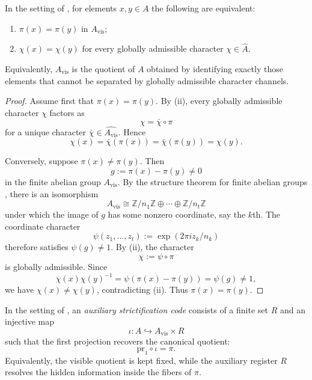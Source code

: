 \begin{corollary}\label{cor:visible-quotient-character-separation}
In the setting of , for elements $x,y\in A$ the following are equivalent:
\begin{enumerate}[label=(\roman*),nosep]
\item $\pi(x)=\pi(y)$ in $A_{\mathrm{vis}}$;
\item $\chi(x)=\chi(y)$ for every globally admissible character $\chi\in\widehat A$.
\end{enumerate}
Equivalently, $A_{\mathrm{vis}}$ is the quotient of $A$ obtained by identifying exactly those elements that cannot be separated by globally admissible character channels.
\end{corollary}

\begin{proof}
Assume first that $\pi(x)=\pi(y)$. By (ii), every globally admissible character $\chi$ factors as
\[
\chi=\bar\chi\circ\pi
\]
for a unique character $\bar\chi\in\widehat{A_{\mathrm{vis}}}$. Hence
\[
\chi(x)=\bar\chi(\pi(x))=\bar\chi(\pi(y))=\chi(y).
\]

Conversely, suppose $\pi(x)\neq\pi(y)$. Then
\[
g:=\pi(x)-\pi(y)\neq 0
\]
in the finite abelian group $A_{\mathrm{vis}}$. By the structure theorem for finite abelian groups \cite{DummitFoote2004}, there is an isomorphism
\[
A_{\mathrm{vis}}\cong \mathbb Z/n_1\mathbb Z\oplus\cdots\oplus \mathbb Z/n_t\mathbb Z
\]
under which the image of $g$ has some nonzero coordinate, say the $k$th. The coordinate character
\[
\psi(z_1,\dots,z_t):=\exp(2\pi i z_k/n_k)
\]
therefore satisfies $\psi(g)\neq 1$. By (ii), the character
\[
\chi:=\psi\circ\pi
\]
is globally admissible. Since
\[
\chi(x)\chi(y)^{-1}=\psi(\pi(x)-\pi(y))=\psi(g)\neq 1,
\]
we have $\chi(x)\neq\chi(y)$, contradicting (ii). Thus $\pi(x)=\pi(y)$.
\end{proof}

\begin{definition}\label{def:auxiliary-strictification-code}
In the setting of , an \emph{auxiliary strictification code} consists of a finite set $R$ and an injective map
\[
\iota:A\hookrightarrow A_{\mathrm{vis}}\times R
\]
such that the first projection recovers the canonical quotient:
\[
\mathrm{pr}_1\circ\iota=\pi.
\]
Equivalently, the visible quotient is kept fixed, while the auxiliary register $R$ resolves the hidden information inside the fibers of $\pi$.
\end{definition}

